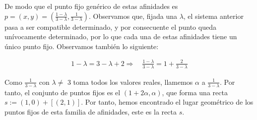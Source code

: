 De modo que el punto fijo genérico de estas afinidades es $p = (x,y) = (\frac{1 - \lambda}{3 - \lambda}, \frac{1}{3 - \lambda})$. Observamos que, fijada una $\lambda$, el sistema anterior pasa a ser compatible determinado, y por consecuente el punto queda unívocamente determinado, por lo que cada una de estas afinidades tiene un único punto fijo. Observamos también lo siguiente:

\begin{gather*}
    1 - \lambda = 3 -\lambda + 2 \Longrightarrow \quad \frac{1 - \lambda}{3 - \lambda} = 1 + \frac{2}{3 - \lambda}
\end{gather*}

Como $\frac{1}{3 - \lambda}$ con $\lambda \neq$ 3 toma todos los valores reales, llamemos $\alpha$ a $\frac{1}{3 - \lambda}$. Por tanto, el conjunto de puntos fijos es el $(1 + 2\alpha, \alpha)$, que forma una recta $s := (1,0)+ [(2,1)]$. Por tanto, hemos encontrado el lugar geométrico de los puntos fijos de  esta familia de afinidades, este es la recta $s$.